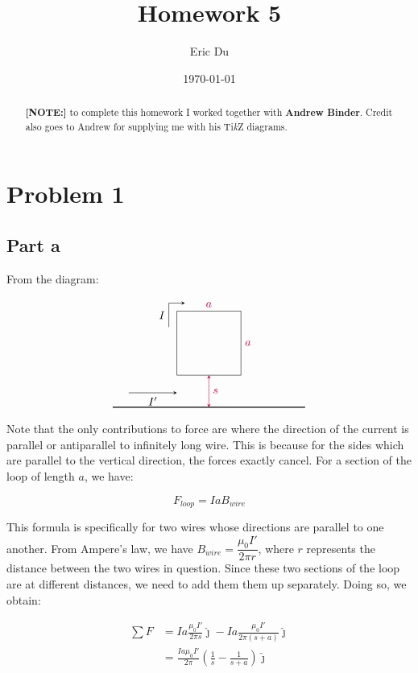 \documentclass{article}
\title{Homework 5}
\author{Eric Du}
\date{\today}
\theoremstyle{definition}
\numberwithin{equation}{section}
\numberwithin{definition}{section}
\begin{document}
\maketitle
\begin{abstract}
    \textbf{[NOTE:]} to complete this homework I worked together with \textbf{Andrew Binder}. Credit also goes to Andrew for supplying me with his Ti\textit{k}Z diagrams.
\end{abstract}

\section{Problem 1}

\subsection{Part a}
\label{q1a}
From the diagram: 

$$\begin{tikzpicture}
    \draw[thick] (-3,-1) -- (3,-1);
    \draw (-1,0) -- (1,0) -- (1,2) node[midway, right, color=purple] {$a$} -- (-1,2) node[midway, above, color=purple] {$a$} -- cycle;
    \draw[-stealth] (-2.5,-0.55) -- (-1,-0.55) node[midway, below] {$I'$};
    \draw[stealth-stealth, color=purple] (0,-1) -- (0,0) node[midway, right] {$s$};
    \draw[-stealth] (-1.25,1.5) -- (-1.25,2.25) node[midway, left] {$I$} -- (-0.75,2.25);
  \end{tikzpicture}$$

Note that the only contributions to force are where the direction of the current is parallel or antiparallel to infinitely long wire. This is because for the sides which are parallel to the vertical direction, the forces exactly cancel. For a section of the loop of length $a$, we have:

\[ F_{loop} = I a B_{wire}\]

This formula is specifically for two wires whose directions are parallel to one another. From Ampere's law, we have $B_{wire} = \dfrac{\mu_0 I'}{2\pi r}$, where $r$ represents the distance between the two wires in question. Since these two sections of the loop are at different distances, we need to add them them up separately. Doing so, we obtain:

\begin{align*}
    \sum F &= Ia \frac{\mu_0I'}{2\pi s}\hat \jmath  - Ia\frac{\mu_0I'}{2\pi (s+a)}\hat \jmath\\
    &= \frac{Ia\mu_0I'}{2\pi}\left(\frac{1}{s} - \frac{1}{s+a}\right)\hat \jmath
\end{align*}
\end{document}
